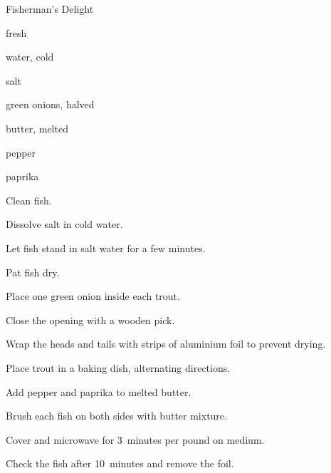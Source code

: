 \begin{recipe}{Fisherman's Delight}{}{}

\begin{ingredients}
\item fresh 
\item {} water, cold
\item \C{\quarter} salt
\item green onions, halved
\item butter, melted
\item pepper
\item paprika
\end{ingredients}

\begin{directions}
\item Clean fish.
\item Dissolve salt in cold water.
\item Let fish stand in salt water for a few minutes.
\item Pat fish dry.
\item Place one green onion inside each trout.
\item Close the opening with a wooden pick.
\item Wrap the heads and tails with strips of aluminium foil to prevent drying.
\item Place trout in a baking dish, alternating directions.
\item Add pepper and paprika to melted butter.
\item Brush each fish on both sides with butter mixture.
\item Cover and microwave for 3~minutes per pound on medium.
\item Check the fish after 10~minutes and remove the foil.
\end{directions}

\end{recipe}
